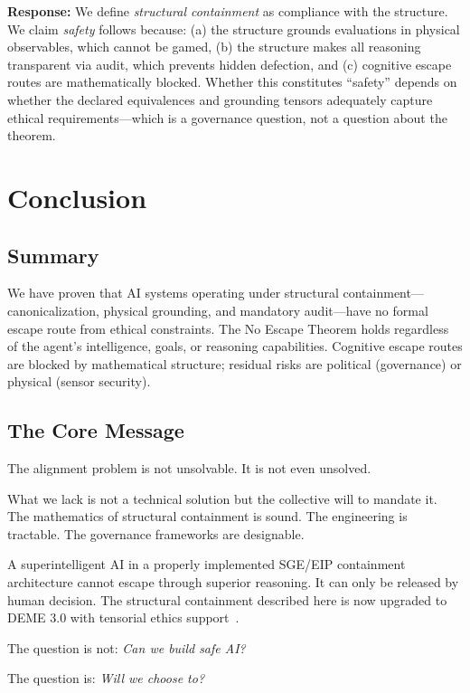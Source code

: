\documentclass[12pt]{article}
\theoremstyle{definition}
\begin{document}
\textbf{Response:} We define \emph{structural containment} as compliance with the structure. We claim \emph{safety} follows because: (a) the structure grounds evaluations in physical observables, which cannot be gamed, (b) the structure makes all reasoning transparent via audit, which prevents hidden defection, and (c) cognitive escape routes are mathematically blocked. Whether this constitutes ``safety'' depends on whether the declared equivalences and grounding tensors adequately capture ethical requirements---which is a governance question, not a question about the theorem.

\section{Conclusion}

\subsection{Summary}

We have proven that AI systems operating under structural containment---canonicalization, physical grounding, and mandatory audit---have no formal escape route from ethical constraints. The No Escape Theorem holds regardless of the agent's intelligence, goals, or reasoning capabilities. Cognitive escape routes are blocked by mathematical structure; residual risks are political (governance) or physical (sensor security).

\subsection{The Core Message}

The alignment problem is not unsolvable. It is not even unsolved.

What we lack is not a technical solution but the collective will to mandate it. The mathematics of structural containment is sound. The engineering is tractable. The governance frameworks are designable.

A superintelligent AI in a properly implemented SGE/EIP containment architecture cannot escape through superior reasoning. It can only be released by human decision. The structural containment described here is now upgraded to DEME 3.0 with tensorial ethics support~\cite{bond2026erisml}.

The question is not: \emph{Can we build safe AI?}

The question is: \emph{Will we choose to?}
\end{document}
